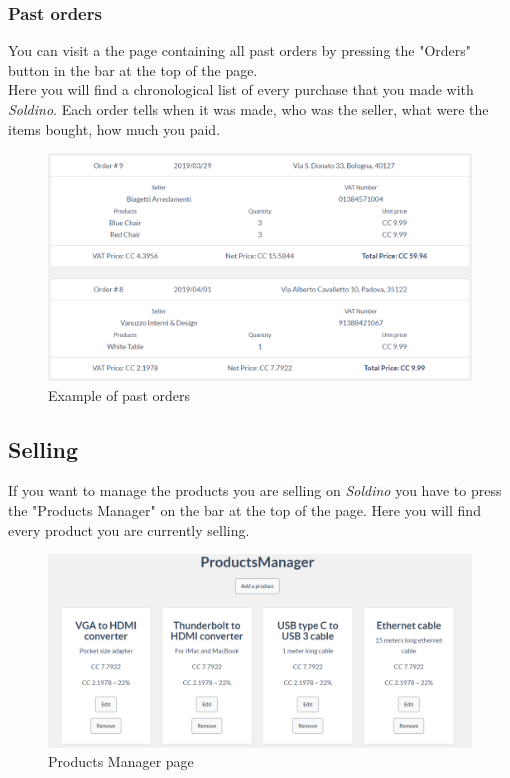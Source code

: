 	\subsubsection{Past orders}
	You can visit a the page containing all past orders by pressing the "Orders" 
	button in the bar at the top of the page.\\
	Here you will find a chronological list of every purchase that you made with 
	\textit{Soldino}. Each order tells when it was made, who was the seller, 
	what were the items bought, how much you paid.
	\begin{figure}[H]
		\includegraphics[width=15cm]{res/images/past_orders.png}
		\centering
		\caption{Example of past orders}
	\end{figure}

	\subsection{Selling}
	If you want to manage the products you are selling on \textit{Soldino} you 
	have to press the "Products Manager" on the bar at the top of the page. 
	Here you will find every product you are currently selling.
	\begin{figure}[H]
		\includegraphics[width=15cm]{res/images/products_manager.png}
		\centering
		\caption{Products Manager page}
	\end{figure}
